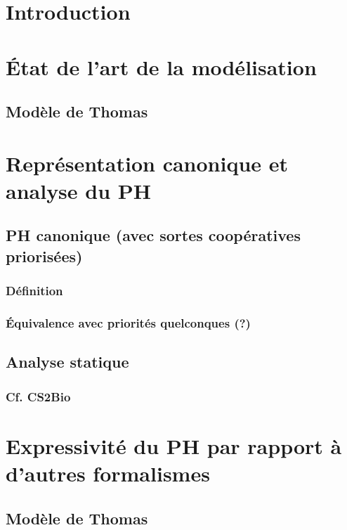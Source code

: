 \documentclass[a4paper]{report}
\begin{document}
\setcounter{tocdepth}{3}
\tableofcontents



\chapter{Introduction}

\chapter{État de l'art de la modélisation}
  \section{Modèle de Thomas}
  



\chapter{Représentation canonique et analyse du PH}
  \section{PH canonique (avec sortes coopératives priorisées)}
    \subsection{Définition}
    \subsection{Équivalence avec priorités quelconques (?)}
  \section{Analyse statique}
    \subsection{Cf. CS2Bio}

\chapter{Expressivité du PH par rapport à d'autres formalismes}
  \section{Modèle de Thomas}
\end{document}
